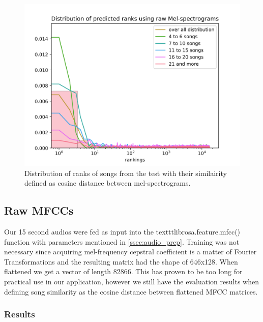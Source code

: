 \begin{figure}[h]
    \centering
	\includegraphics[width=120mm]{./img/mel_graph.png}
	\caption{Distribution of ranks of songs from the test with their similairity defined as cosine distance between mel-spectrograms.}
	\label{fig:mel_graph}
\end{figure}

\subsection{Raw MFCCs}
Our 15 second audios were fed as input into the texttt{librosa.feature.mfcc()} function with parameters mentioned in \ref{ssec:audio_prep}. Training was not necessary since acquiring mel-frequency cepstral coefficient is a matter of Fourier Transformations and the resulting matrix had the shape of 646x128. When flattened we get a vector of length 82866. This has proven to be too long for practical use in our application, however we still have the evaluation results when defining song similarity as the cosine distance between flattened MFCC matrices.

\subsubsection{Results}

